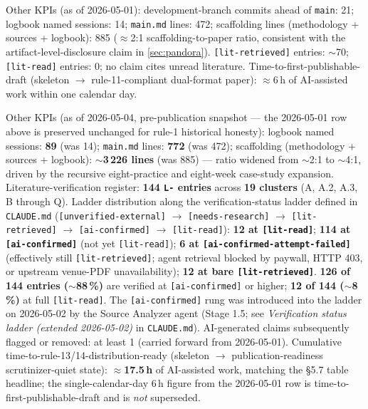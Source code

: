 \documentclass[11pt,a4paper]{article}
\begin{document}
Other KPIs (as of 2026-05-01): development-branch commits ahead of
\texttt{main}: 21; logbook named sessions: 14; \texttt{main.md} lines:
472; scaffolding lines (methodology + sources + logbook): 885 ($\approx$2:1
scaffolding-to-paper ratio, consistent with the artifact-level-disclosure
claim in \cref{sec:pandora}). \texttt{[lit-retrieved]} entries: $\sim$70;
\texttt{[lit-read]} entries: 0; no claim cites unread literature.
Time-to-first-publishable-draft (skeleton $\rightarrow$ rule-11-compliant
dual-format paper): $\approx$6\,h of AI-assisted work within one
calendar day.

Other KPIs (as of 2026-05-04, pre-publication snapshot --- the
2026-05-01 row above is preserved unchanged for rule-1 historical
honesty): logbook named sessions: \textbf{89} (was 14);
\texttt{main.md} lines: \textbf{772} (was 472); scaffolding
(methodology + sources + logbook): \textbf{$\sim$3\,226 lines}
(was 885) --- ratio widened from $\sim$2:1 to $\sim$4:1, driven by
the recursive eight-practice and eight-week case-study expansion.
Literature-verification register: \textbf{144 \texttt{L-} entries}
across \textbf{19 clusters} (A, A.2, A.3, B through Q). Ladder
distribution along the verification-status ladder defined in
\texttt{CLAUDE.md} (\texttt{[unverified-external]} $\rightarrow$
\texttt{[needs-research]} $\rightarrow$ \texttt{[lit-retrieved]}
$\rightarrow$ \texttt{[ai-confirmed]} $\rightarrow$
\texttt{[lit-read]}): \textbf{12 at \texttt{[lit-read]}};
\textbf{114 at \texttt{[ai-confirmed]}} (not yet \texttt{[lit-read]});
\textbf{6 at \texttt{[ai-confirmed-attempt-failed]}} (effectively
still \texttt{[lit-retrieved]}; agent retrieval blocked by paywall,
HTTP 403, or upstream venue-PDF unavailability); \textbf{12 at bare
\texttt{[lit-retrieved]}}. \textbf{126 of 144 entries
($\sim$88\,\%)} are verified at \texttt{[ai-confirmed]} or higher;
\textbf{12 of 144 ($\sim$8\,\%)} at full \texttt{[lit-read]}. The
\texttt{[ai-confirmed]} rung was introduced into the ladder on
2026-05-02 by the Source Analyzer agent (Stage 1.5; see
\emph{Verification status ladder (extended 2026-05-02)} in
\texttt{CLAUDE.md}). AI-generated claims subsequently flagged or
removed: at least 1 (carried forward from 2026-05-01). Cumulative
time-to-rule-13/14-distribution-ready (skeleton $\rightarrow$
publication-readiness scrutinizer-quiet state):
\textbf{$\approx$17.5\,h} of AI-assisted work, matching the \S{}5.7
table headline; the single-calendar-day 6\,h figure from the
2026-05-01 row is time-to-first-publishable-draft and is \emph{not}
superseded.
\end{document}
